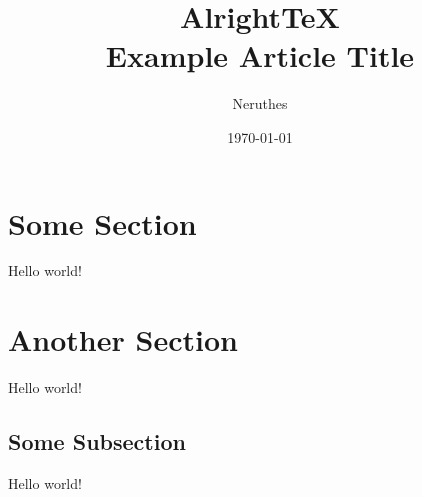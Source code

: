 \documentclass[11pt,a4paper]{article}
\title{AlrightTeX\\Example Article Title}
\author{Neruthes}
\date{\today}
\begin{document}
\maketitle

\tableofcontents

\section{Some Section}
Hello world!

\lipsum[1-3][1-5]


\section{Another Section}
Hello world!

\lipsum[1-3][1-5]

\subsection{Some Subsection}
Hello world!

\lipsum[1-3][1-5]
\end{document}
